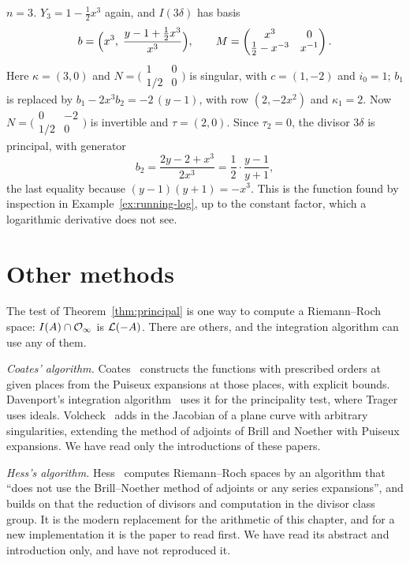 \begin{example}
\emph{$n = 3$.} $Y_3 = 1 - \frac12 x^3$ again, and $I(3\delta)$ has basis
\[
  b = \Bigl( x^3,\; \frac{y - 1 + \frac12 x^3}{x^3} \Bigr),
  \qquad M = \begin{pmatrix} x^3 & 0 \\ \frac12 - x^{-3} & x^{-1} \end{pmatrix} .
\]
Here $\kappa = (3, 0)$ and $N = \bigl(\begin{smallmatrix} 1 & 0 \\ 1/2 & 0
\end{smallmatrix}\bigr)$ is singular, with $c = (1, -2)$ and $i_0 = 1$; $b_1$
is replaced by $b_1 - 2x^3 b_2 = -2\,(y - 1)$, with row $(2, -2x^2)$ and
$\kappa_1 = 2$. Now $N = \bigl(\begin{smallmatrix} 0 & -2 \\ 1/2 & 0
\end{smallmatrix}\bigr)$ is invertible and $\tau = (2, 0)$. Since $\tau_2 =
0$, the divisor $3\delta$ is principal, with generator
\[
  b_2 = \frac{2y - 2 + x^3}{2x^3} = \frac12 \cdot \frac{y - 1}{y + 1} ,
\]
the last equality because $(y - 1)(y + 1) = -x^3$. This is the function found
by inspection in Example~\ref{ex:running-log}, up to the constant factor,
which a logarithmic derivative does not see.
\end{example}

\section{Other methods}\label{sec:div-others}

The test of Theorem~\ref{thm:principal} is one way to compute a
Riemann--Roch space: $I(A) \cap \mathcal{O}_\infty$ is $\mathcal{L}(-A)$. There are others,
and the integration algorithm can use any of them.

\emph{Coates' algorithm.} Coates~\cite{coates1970} constructs the functions
with prescribed orders at given places from the Puiseux expansions at those
places, with explicit bounds. Davenport's integration
algorithm~\cite{davenport1981} uses it for the principality test, where
Trager uses ideals. Volcheck~\cite{volcheck1994} adds in the Jacobian of a
plane curve with arbitrary singularities, extending the method of adjoints
of Brill and Noether with Puiseux expansions. We have read only the
introductions of these papers.

\emph{Hess's algorithm.\later} Hess~\cite{hess2002} computes Riemann--Roch
spaces by an algorithm that ``does not use the Brill--Noether method of
adjoints or any series expansions'', and builds on that the reduction of divisors and computation in
the divisor class group. It is the modern replacement for the arithmetic of
this chapter, and for a new implementation it is the paper to read first. We
have read its abstract and introduction only, and have not reproduced it.

